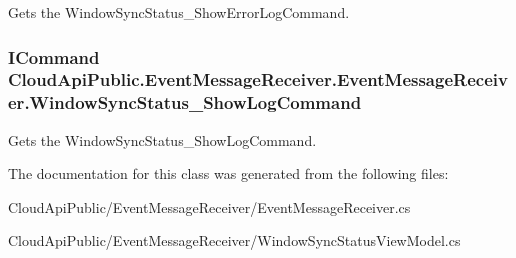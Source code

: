 Gets the Window\-Sync\-Status\-\_\-\-Show\-Error\-Log\-Command. 

\hypertarget{class_cloud_api_public_1_1_event_message_receiver_1_1_event_message_receiver_a2d3561dbc21714c80eaa066e98fcb0dd}{
\subsubsection[{Window\-Sync\-Status\-\_\-\-Show\-Log\-Command}]{\setlength{\rightskip}{0pt plus 5cm}I\-Command Cloud\-Api\-Public.\-Event\-Message\-Receiver.\-Event\-Message\-Receiver.\-Window\-Sync\-Status\-\_\-\-Show\-Log\-Command\hspace{0.3cm}{\ttfamily [get]}}}\label{class_cloud_api_public_1_1_event_message_receiver_1_1_event_message_receiver_a2d3561dbc21714c80eaa066e98fcb0dd}


Gets the Window\-Sync\-Status\-\_\-\-Show\-Log\-Command. 



The documentation for this class was generated from the following files\-:\begin{DoxyCompactItemize}
\item 
Cloud\-Api\-Public/\-Event\-Message\-Receiver/Event\-Message\-Receiver.\-cs\item 
Cloud\-Api\-Public/\-Event\-Message\-Receiver/Window\-Sync\-Status\-View\-Model.\-cs\end{DoxyCompactItemize}
